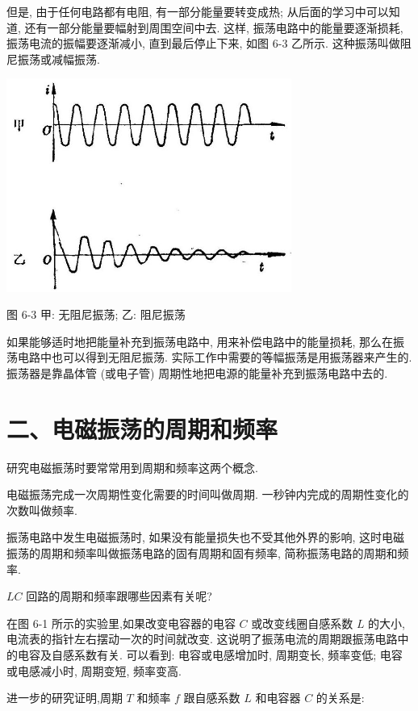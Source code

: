 \documentclass[10pt]{article}
\begin{document}
但是, 由于任何电路都有电阻, 有一部分能量要转变成热; 从后面的学习中可以知道, 还有一部分能量要幅射到周围空间中去. 这样, 振荡电路中的能量要逐渐损耗, 振荡电流的振幅要逐渐减小, 直到最后停止下来, 如图 6-3 乙所示. 这种振荡叫做阻尼振荡或减幅振荡.

\begin{center}
\includegraphics[max width=0.7\textwidth]{images/01913056-1f15-74d8-9184-9aab52c9d66b_196_957710.jpg}
\end{center}

图 6-3 甲: 无阻尼振荡; 乙: 阻尼振荡

如果能够适时地把能量补充到振荡电路中, 用来补偿电路中的能量损耗, 那么在振荡电路中也可以得到无阻尼振荡. 实际工作中需要的等幅振荡是用振荡器来产生的. 振荡器是靠晶体管 (或电子管) 周期性地把电源的能量补充到振荡电路中去的.

\section*{二、电磁振荡的周期和频率}

研究电磁振荡时要常常用到周期和频率这两个概念.

电磁振荡完成一次周期性变化需要的时间叫做周期. 一秒钟内完成的周期性变化的次数叫做频率.

振荡电路中发生电磁振荡时, 如果没有能量损失也不受其他外界的影响, 这时电磁振荡的周期和频率叫做振荡电路的固有周期和固有频率, 简称振荡电路的周期和频率.

\({LC}\) 回路的周期和频率跟哪些因素有关呢?

在图 6-1 所示的实验里,如果改变电容器的电容 \(C\) 或改变线圈自感系数 \(L\) 的大小,电流表的指针左右摆动一次的时间就改变. 这说明了振荡电流的周期跟振荡电路中的电容及自感系数有关. 可以看到: 电容或电感增加时, 周期变长, 频率变低; 电容或电感减小时, 周期变短, 频率变高.

进一步的研究证明,周期 \(T\) 和频率 \(f\) 跟自感系数 \(L\) 和电容器 \(C\) 的关系是:
\end{document}
